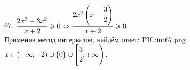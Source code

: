 67. $\cfrac{2x^3-3x^2}{x+2}\geqslant0\Leftrightarrow\cfrac{2x^2\left(x-\cfrac{3}{2}\right)}{x+2}\geqslant0.$\\ Применив метод интервалов, найдём ответ:
{{PIC:int67.png}}
$x\in\left(-\infty;-2\right)\cup\{0\}\cup\left[\cfrac{3}{2};+\infty\right).$\\
